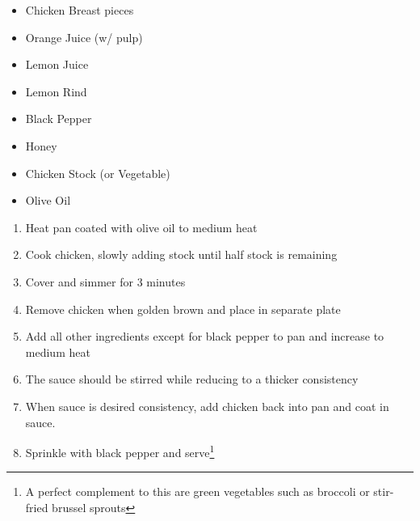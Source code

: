 \documentclass[oneside]{recipe}
\newcommand{\recipecolumn}[2]{
	\begin{multicols}{2}
	\raggedcolumns
	#1
	\columnbreak
	#2
	\end{multicols}
}
\begin{document}
\newpage
{}
\recipecolumn{
	\begin{itemize}
		\item Chicken Breast pieces
		\item Orange Juice (w/ pulp)
		\item Lemon Juice
		\item Lemon Rind
		\item Black Pepper
		\item Honey
		\item Chicken Stock (or Vegetable)
		\item Olive Oil
	\end{itemize}
}{	
	\begin{enumerate}
		\item Heat pan coated with olive oil to medium heat
		\item Cook chicken, slowly adding stock until half stock is remaining
		\item Cover and simmer for 3 minutes
		\item Remove chicken when golden brown and place in separate plate
		\item Add all other ingredients except for black pepper to pan and increase to medium heat
		\item The sauce should be stirred while reducing to a thicker consistency
		\item When sauce is desired consistency, add chicken back into pan and coat in sauce. 
		\item Sprinkle with black pepper and serve\footnote{A perfect complement to this are green vegetables such as broccoli or stir-fried brussel sprouts}
	\end{enumerate}
}
\end{document}
